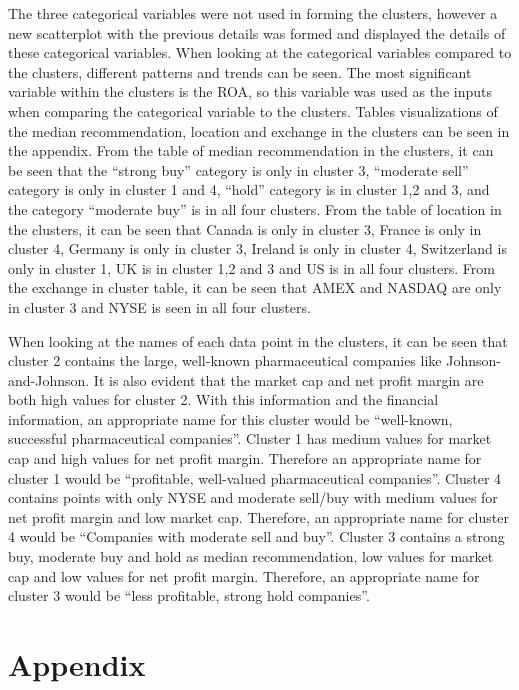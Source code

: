 \documentclass[11pt]{article}
\begin{document}
The three categorical variables were not used in forming the clusters, however a new scatterplot with the previous details was formed and displayed the details of these categorical variables. When looking at the categorical variables compared to the clusters, different patterns and trends can be seen. The most significant variable within the clusters is the ROA, so this variable was used as the inputs when comparing the categorical variable to the clusters. Tables visualizations of the median recommendation, location and exchange in the clusters can be seen in the appendix. From the table of median recommendation in the clusters, it can be seen that the “strong buy” category is only in cluster 3, “moderate sell” category is only in cluster 1 and 4, “hold” category is in cluster 1,2 and 3, and the category “moderate buy” is in all four clusters. From the table of location in the clusters, it can be seen that Canada is only in cluster 3, France is only in cluster 4, Germany is only in cluster 3, Ireland is only in cluster 4, Switzerland is only in cluster 1, UK is in cluster 1,2 and 3 and US is in all four clusters. From the exchange in cluster table, it can be seen that AMEX and NASDAQ are only in cluster 3 and NYSE is seen in all four clusters. 

When looking at the names of each data point in the clusters, it can be seen that cluster 2 contains the large, well-known pharmaceutical companies like Johnson-and-Johnson. It is also evident that the market cap and net profit margin are both high values for cluster 2. With this information and the financial information, an appropriate name for this cluster would be “well-known, successful pharmaceutical companies”. Cluster 1 has medium values for market cap and high values for net profit margin. Therefore an appropriate name for cluster 1 would be “profitable, well-valued pharmaceutical companies”. Cluster 4 contains points with only NYSE and moderate sell/buy with medium values for net profit margin and low market cap. Therefore, an appropriate name for cluster 4 would be “Companies with moderate sell and buy”. Cluster 3 contains a strong buy, moderate buy and hold as median recommendation, low values for market cap and low values for net profit margin. Therefore, an appropriate name for cluster 3 would be “less profitable, strong hold companies”.


\newpage
{}%
\renewcommand*{\thepage}{A\arabic{page}}
\appendix 

\section{Appendix}
\end{document}
